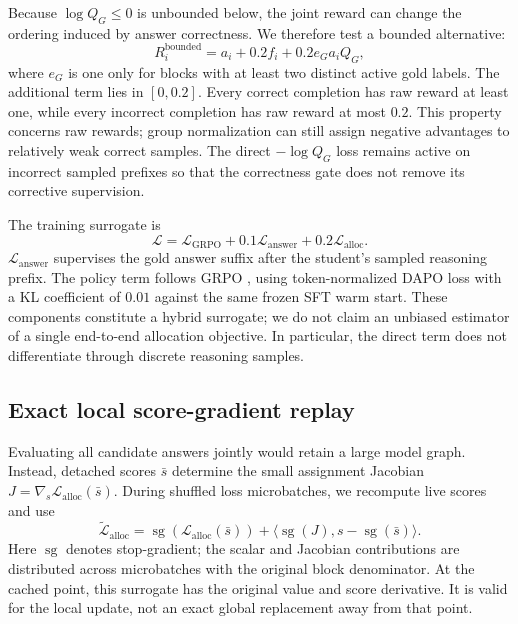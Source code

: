 \documentclass[11pt]{article}
\begin{document}
Because $\log Q_G\leq0$ is unbounded below, the joint reward can change the ordering induced by answer correctness. We therefore test a bounded alternative:
\begin{equation}
 R_i^{\mathrm{bounded}}=a_i+0.2f_i
       +0.2e_G a_i Q_G,
 \label{eq:bounded}
\end{equation}
where $e_G$ is one only for blocks with at least two distinct active gold labels. The additional term lies in $[0,0.2]$. Every correct completion has raw reward at least one, while every incorrect completion has raw reward at most $0.2$. This property concerns raw rewards; group normalization can still assign negative advantages to relatively weak correct samples. The direct $-\log Q_G$ loss remains active on incorrect sampled prefixes so that the correctness gate does not remove its corrective supervision.

The training surrogate is
\begin{equation}
 \mathcal L=\mathcal L_{\mathrm{GRPO}}
   +0.1\mathcal L_{\mathrm{answer}}
   +0.2\mathcal L_{\mathrm{alloc}}.
 \label{eq:loss}
\end{equation}
$\mathcal L_{\mathrm{answer}}$ supervises the gold answer suffix after the student's sampled reasoning prefix. The policy term follows GRPO \citep{shao-etal-2024-deepseekmath}, using token-normalized DAPO loss \citep{yu-etal-2025-dapo} with a KL coefficient of $0.01$ against the same frozen SFT warm start. These components constitute a hybrid surrogate; we do not claim an unbiased estimator of a single end-to-end allocation objective. In particular, the direct term does not differentiate through discrete reasoning samples.

\subsection{Exact local score-gradient replay}
Evaluating all candidate answers jointly would retain a large model graph. Instead, detached scores $\bar s$ determine the small assignment Jacobian $J=\nabla_s\mathcal L_{\mathrm{alloc}}(\bar s)$. During shuffled loss microbatches, we recompute live scores and use
\begin{equation}
 \widetilde{\mathcal L}_{\mathrm{alloc}}
 =\operatorname{sg}(\mathcal L_{\mathrm{alloc}}(\bar s))
   +\langle\operatorname{sg}(J),s-\operatorname{sg}(\bar s)\rangle.
\end{equation}
Here $\operatorname{sg}$ denotes stop-gradient; the scalar and Jacobian contributions are distributed across microbatches with the original block denominator. At the cached point, this surrogate has the original value and score derivative. It is valid for the local update, not an exact global replacement away from that point.
\end{document}
